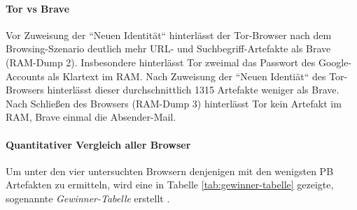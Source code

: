 \paragraph*{Tor vs Brave}
Vor Zuweisung der ``Neuen Identität`` hinterlässt der Tor-Browser nach dem Browsing-Szenario  deutlich mehr URL- und Suchbegriff-Artefakte als Brave (RAM-Dump 2). Insbesondere hinterlässt Tor zweimal das Passwort des Google-Accounts als Klartext im RAM.
Nach Zuweisung der ``Neuen Identiät`` des Tor-Browsers hinterlässt dieser durchschnittlich 1315 Artefakte weniger als Brave.
Nach Schließen des Browsers (RAM-Dump 3) hinterlässt Tor kein Artefakt im RAM, Brave einmal die Absender-Mail. 

\paragraph*{Quantitativer Vergleich aller Browser}
Um unter den vier untersuchten Browsern denjenigen mit den wenigsten PB Artefakten zu ermitteln, wird eine in Tabelle \ref{tab:gewinner-tabelle} gezeigte, sogenannte  \textit{Gewinner-Tabelle} erstellt \cite{Horsman.2019}.

